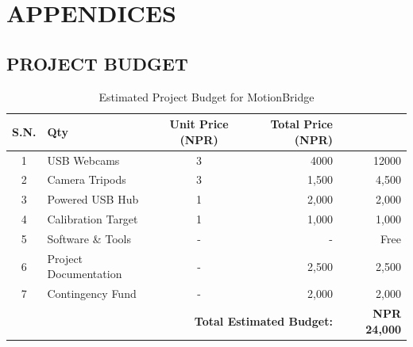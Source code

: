 \chapter{APPENDICES}
\section{PROJECT BUDGET}
\begin{table}[h!]
\centering
\caption{Estimated Project Budget for MotionBridge}
\label{tab:budget}
\renewcommand{\arraystretch}{1.2}
\small
\begin{tabular}{c l c r r}
\toprule
\textbf{S.N.} & \textbf{Qty} & \textbf{Unit Price (NPR)} & \textbf{Total Price (NPR)} \\
\midrule
1 & USB Webcams & 3 & 4000 & 12000 \\
2 & Camera Tripods & 3 & 1,500 & 4,500 \\
3 & Powered USB Hub & 1 & 2,000 & 2,000 \\
4 & Calibration Target & 1 & 1,000 & 1,000 \\
5 & Software \& Tools & - & - & Free \\
6 & Project Documentation & - & 2,500 & 2,500 \\
7 & Contingency Fund & - & 2,000 & 2,000 \\
\midrule
\multicolumn{4}{r}{\textbf{Total Estimated Budget:}} & \textbf{NPR 24,000} \\
\bottomrule
\end{tabular}
\end{table}

